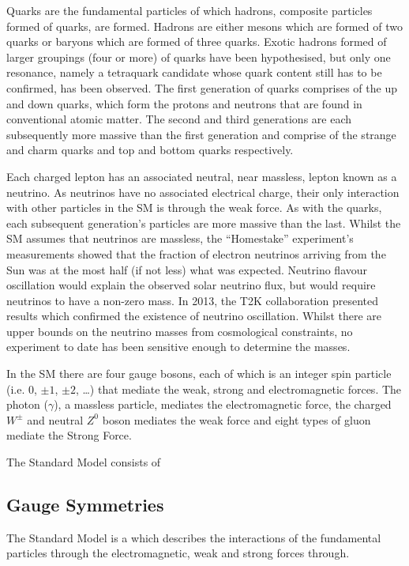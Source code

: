 Quarks are the fundamental particles of which hadrons, composite particles formed of quarks, are formed. 
Hadrons are either mesons which are formed of two quarks or baryons which are formed of three quarks. 
Exotic hadrons formed of larger groupings (four or more) of quarks have been hypothesised, but only one resonance, namely a tetraquark candidate whose quark content still has to be confirmed, has been observed\cite{PhysRevLett.112.222002}. 
The first generation of quarks comprises of the up and down quarks, which form the protons and neutrons that are found in conventional atomic matter. 
The second and third generations are each subsequently more massive than the first generation and comprise of the strange and charm quarks and top and bottom quarks respectively. 

Each charged lepton has an associated neutral, near massless, lepton known as a neutrino. 
As neutrinos have no associated electrical charge, their only interaction with other particles in the SM is through the weak force. 
As with the quarks, each subsequent generation's particles are more massive than the last. 
Whilst the SM assumes that neutrinos are massless, the ``Homestake'' experiment's measurements showed that the fraction of electron neutrinos arriving from the Sun was at the most half (if not less) what was expected\cite{PhysRevLett.20.1205}. 
Neutrino flavour oscillation would explain the observed solar neutrino flux, but would require neutrinos to have a non-zero mass. 
In 2013, the T2K collaboration presented results which confirmed the existence of neutrino oscillation\cite{PhysRevD.88.032002}. 
Whilst there are upper bounds on the neutrino masses from cosmological constraints, no experiment to date has been sensitive enough to determine the masses\cite{1475-7516-2006-06-019}. 

In the SM there are four gauge bosons, each of which is an integer spin particle (i.e. 0, $\pm 1$, $\pm 2$, …) that mediate the weak, strong and electromagnetic forces. 
The photon ($\gamma$), a massless particle, mediates the electromagnetic force, the charged $W^\pm$ and neutral $Z^0$ boson mediates the weak force and eight types of gluon mediate the Strong Force\cite{LagrangiansSM}. 

The Standard Model consists of 



\subsection{Gauge Symmetries}\label{subsec:gaugeSymmetries}
The Standard Model is a which describes the interactions of the fundamental particles through the electromagnetic, weak and strong forces through.

